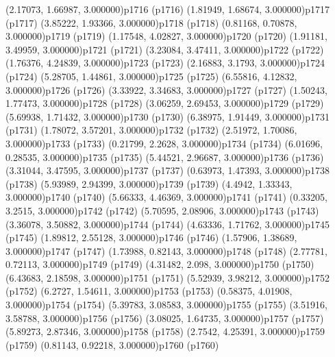 \psPoint(2.17073, 1.66987, 3.000000){p1716}
\psdot(p1716)
\psPoint(1.81949, 1.68674, 3.000000){p1717}
\psdot(p1717)
\psPoint(3.85222, 1.93366, 3.000000){p1718}
\psdot(p1718)
\psPoint(0.81168, 0.70878, 3.000000){p1719}
\psdot(p1719)
\psPoint(1.17548, 4.02827, 3.000000){p1720}
\psdot(p1720)
\psPoint(1.91181, 3.49959, 3.000000){p1721}
\psdot(p1721)
\psPoint(3.23084, 3.47411, 3.000000){p1722}
\psdot(p1722)
\psPoint(1.76376, 4.24839, 3.000000){p1723}
\psdot(p1723)
\psPoint(2.16883, 3.1793, 3.000000){p1724}
\psdot(p1724)
\psPoint(5.28705, 1.44861, 3.000000){p1725}
\psdot(p1725)
\psPoint(6.55816, 4.12832, 3.000000){p1726}
\psdot(p1726)
\psPoint(3.33922, 3.34683, 3.000000){p1727}
\psdot(p1727)
\psPoint(1.50243, 1.77473, 3.000000){p1728}
\psdot(p1728)
\psPoint(3.06259, 2.69453, 3.000000){p1729}
\psdot(p1729)
\psPoint(5.69938, 1.71432, 3.000000){p1730}
\psdot(p1730)
\psPoint(6.38975, 1.91449, 3.000000){p1731}
\psdot(p1731)
\psPoint(1.78072, 3.57201, 3.000000){p1732}
\psdot(p1732)
\psPoint(2.51972, 1.70086, 3.000000){p1733}
\psdot(p1733)
\psPoint(0.21799, 2.2628, 3.000000){p1734}
\psdot(p1734)
\psPoint(6.01696, 0.28535, 3.000000){p1735}
\psdot(p1735)
\psPoint(5.44521, 2.96687, 3.000000){p1736}
\psdot(p1736)
\psPoint(3.31044, 3.47595, 3.000000){p1737}
\psdot(p1737)
\psPoint(0.63973, 1.47393, 3.000000){p1738}
\psdot(p1738)
\psPoint(5.93989, 2.94399, 3.000000){p1739}
\psdot(p1739)
\psPoint(4.4942, 1.33343, 3.000000){p1740}
\psdot(p1740)
\psPoint(5.66333, 4.46369, 3.000000){p1741}
\psdot(p1741)
\psPoint(0.33205, 3.2515, 3.000000){p1742}
\psdot(p1742)
\psPoint(5.70595, 2.08906, 3.000000){p1743}
\psdot(p1743)
\psPoint(3.36078, 3.50882, 3.000000){p1744}
\psdot(p1744)
\psPoint(4.63336, 1.71762, 3.000000){p1745}
\psdot(p1745)
\psPoint(1.89812, 2.55128, 3.000000){p1746}
\psdot(p1746)
\psPoint(1.57906, 1.38689, 3.000000){p1747}
\psdot(p1747)
\psPoint(1.73988, 0.82143, 3.000000){p1748}
\psdot(p1748)
\psPoint(2.77781, 0.72113, 3.000000){p1749}
\psdot(p1749)
\psPoint(4.31482, 2.098, 3.000000){p1750}
\psdot(p1750)
\psPoint(6.43683, 2.18598, 3.000000){p1751}
\psdot(p1751)
\psPoint(5.52939, 3.98212, 3.000000){p1752}
\psdot(p1752)
\psPoint(6.2727, 1.54611, 3.000000){p1753}
\psdot(p1753)
\psPoint(0.58375, 4.01908, 3.000000){p1754}
\psdot(p1754)
\psPoint(5.39783, 3.08583, 3.000000){p1755}
\psdot(p1755)
\psPoint(3.51916, 3.58788, 3.000000){p1756}
\psdot(p1756)
\psPoint(3.08025, 1.64735, 3.000000){p1757}
\psdot(p1757)
\psPoint(5.89273, 2.87346, 3.000000){p1758}
\psdot(p1758)
\psPoint(2.7542, 4.25391, 3.000000){p1759}
\psdot(p1759)
\psPoint(0.81143, 0.92218, 3.000000){p1760}
\psdot(p1760)
